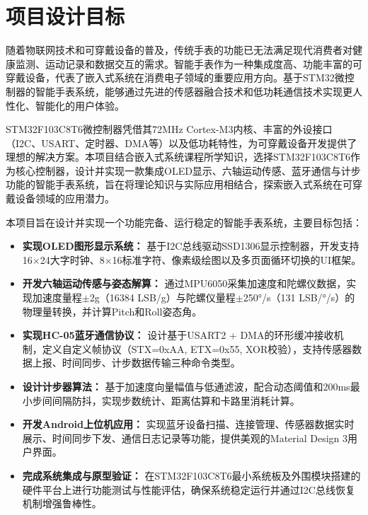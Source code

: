 
\section{项目设计目标}

随着物联网技术和可穿戴设备的普及，传统手表的功能已无法满足现代消费者对健康监测、运动记录和数据交互的需求。智能手表作为一种集成度高、功能丰富的可穿戴设备，代表了嵌入式系统在消费电子领域的重要应用方向。基于STM32微控制器的智能手表系统，能够通过先进的传感器融合技术和低功耗通信技术实现更人性化、智能化的用户体验。

STM32F103C8T6微控制器凭借其72MHz Cortex-M3内核、丰富的外设接口（I2C、USART、定时器、DMA等）以及低功耗特性，为可穿戴设备开发提供了理想的解决方案。本项目结合嵌入式系统课程所学知识，选择STM32F103C8T6作为核心控制器，设计并实现一款集成OLED显示、六轴运动传感、蓝牙通信与计步功能的智能手表系统，旨在将理论知识与实际应用相结合，探索嵌入式系统在可穿戴设备领域的应用潜力。

本项目旨在设计并实现一个功能完备、运行稳定的智能手表系统，主要目标包括：
\begin{itemize}
    \item \textbf{实现OLED图形显示系统：} 基于I2C总线驱动SSD1306显示控制器，开发支持16$\times$24大字时钟、8$\times$16标准字符、像素级绘图以及多页面循环切换的UI框架。
    \item \textbf{开发六轴运动传感与姿态解算：} 通过MPU6050采集加速度和陀螺仪数据，实现加速度量程$\pm$2g（16384 LSB/g）与陀螺仪量程$\pm$250°/s（131 LSB/°/s）的物理量转换，并计算Pitch和Roll姿态角。
    \item \textbf{实现HC-05蓝牙通信协议：} 设计基于USART2 + DMA的环形缓冲接收机制，定义自定义帧协议（STX=0xAA, ETX=0x55, XOR校验），支持传感器数据上报、时间同步、计步数据传输三种命令类型。
    \item \textbf{设计计步器算法：} 基于加速度向量幅值与低通滤波，配合动态阈值和200ms最小步间间隔防抖，实现步数统计、距离估算和卡路里消耗计算。
    \item \textbf{开发Android上位机应用：} 实现蓝牙设备扫描、连接管理、传感器数据实时展示、时间同步下发、通信日志记录等功能，提供美观的Material Design 3用户界面。
    \item \textbf{完成系统集成与原型验证：} 在STM32F103C8T6最小系统板及外围模块搭建的硬件平台上进行功能测试与性能评估，确保系统稳定运行并通过I2C总线恢复机制增强鲁棒性。
\end{itemize}